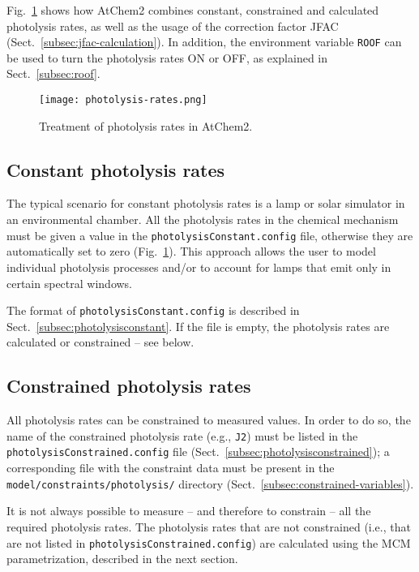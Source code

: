 Fig.~\ref{fig:photol} shows how AtChem2 combines constant, constrained
and calculated photolysis rates, as well as the usage of the
correction factor JFAC (Sect.~\ref{subsec:jfac-calculation}). In
addition, the environment variable \texttt{ROOF} can be used to turn
the photolysis rates ON or OFF, as explained in Sect.~\ref{subsec:roof}.

\begin{figure}[htb]
  \centering
  \texttt{[image: photolysis-rates.png]}
  \caption{Treatment of photolysis rates in AtChem2.} \label{fig:photol}
\end{figure}

\subsection{Constant photolysis rates} \label{subsec:constant-photolysis-rates}

The typical scenario for constant photolysis rates is a lamp or solar
simulator in an environmental chamber. All the photolysis rates in the
chemical mechanism must be given a value in the \texttt{photolysisConstant.config}
file, otherwise they are automatically set to zero (Fig.~\ref{fig:photol}).
This approach allows the user to model individual photolysis processes
and/or to account for lamps that emit only in certain spectral
windows.

The format of \texttt{photolysisConstant.config} is described in
Sect.~\ref{subsec:photolysisconstant}. If the file is empty, the
photolysis rates are calculated or constrained -- see below.

\subsection{Constrained photolysis rates} \label{subsec:constrained-photolysis-rates}

All photolysis rates can be constrained to measured values. In order
to do so, the name of the constrained photolysis rate (e.g.,
\texttt{J2}) must be listed in the
\texttt{photolysisConstrained.config} file
(Sect.~\ref{subsec:photolysisconstrained}); a corresponding file with
the constraint data must be present in the
\texttt{model/constraints/photolysis/} directory
(Sect.~\ref{subsec:constrained-variables}).

It is not always possible to measure -- and therefore to constrain --
all the required photolysis rates. The photolysis rates that are not
constrained (i.e., that are not listed in
\texttt{photolysisConstrained.config}) are calculated using the MCM
parametrization, described in the next section.

